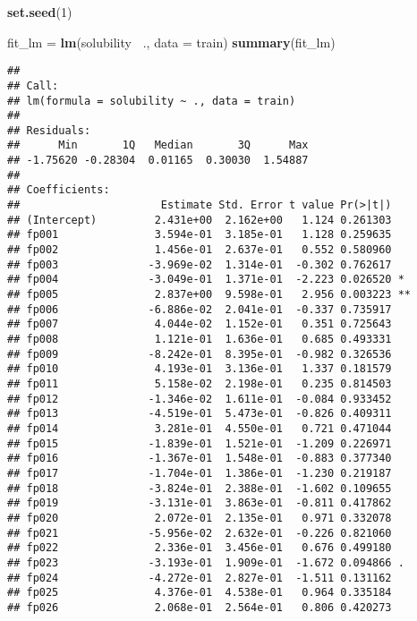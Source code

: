 \documentclass[
]{article}
\newenvironment{Shaded}{\begin{snugshade}}{\end{snugshade}}
\newcommand{\DataTypeTok}[1]{\textcolor[rgb]{0.13,0.29,0.53}{#1}}
\newcommand{\DecValTok}[1]{\textcolor[rgb]{0.00,0.00,0.81}{#1}}
\newcommand{\KeywordTok}[1]{\textcolor[rgb]{0.13,0.29,0.53}{\textbf{#1}}}
\newcommand{\NormalTok}[1]{#1}
\newcommand{\OperatorTok}[1]{\textcolor[rgb]{0.81,0.36,0.00}{\textbf{#1}}}
\newcommand{\StringTok}[1]{\textcolor[rgb]{0.31,0.60,0.02}{#1}}
\begin{document}
\begin{Shaded}
\begin{Highlighting}[]
\KeywordTok{set.seed}\NormalTok{(}\DecValTok{1}\NormalTok{)}

\NormalTok{fit_lm =}\StringTok{ }\KeywordTok{lm}\NormalTok{(solubility }\OperatorTok{~}\NormalTok{., }\DataTypeTok{data =}\NormalTok{ train)}
\KeywordTok{summary}\NormalTok{(fit_lm)}
\end{Highlighting}
\end{Shaded}

\begin{verbatim}
## 
## Call:
## lm(formula = solubility ~ ., data = train)
## 
## Residuals:
##      Min       1Q   Median       3Q      Max 
## -1.75620 -0.28304  0.01165  0.30030  1.54887 
## 
## Coefficients:
##                      Estimate Std. Error t value Pr(>|t|)    
## (Intercept)         2.431e+00  2.162e+00   1.124 0.261303    
## fp001               3.594e-01  3.185e-01   1.128 0.259635    
## fp002               1.456e-01  2.637e-01   0.552 0.580960    
## fp003              -3.969e-02  1.314e-01  -0.302 0.762617    
## fp004              -3.049e-01  1.371e-01  -2.223 0.026520 *  
## fp005               2.837e+00  9.598e-01   2.956 0.003223 ** 
## fp006              -6.886e-02  2.041e-01  -0.337 0.735917    
## fp007               4.044e-02  1.152e-01   0.351 0.725643    
## fp008               1.121e-01  1.636e-01   0.685 0.493331    
## fp009              -8.242e-01  8.395e-01  -0.982 0.326536    
## fp010               4.193e-01  3.136e-01   1.337 0.181579    
## fp011               5.158e-02  2.198e-01   0.235 0.814503    
## fp012              -1.346e-02  1.611e-01  -0.084 0.933452    
## fp013              -4.519e-01  5.473e-01  -0.826 0.409311    
## fp014               3.281e-01  4.550e-01   0.721 0.471044    
## fp015              -1.839e-01  1.521e-01  -1.209 0.226971    
## fp016              -1.367e-01  1.548e-01  -0.883 0.377340    
## fp017              -1.704e-01  1.386e-01  -1.230 0.219187    
## fp018              -3.824e-01  2.388e-01  -1.602 0.109655    
## fp019              -3.131e-01  3.863e-01  -0.811 0.417862    
## fp020               2.072e-01  2.135e-01   0.971 0.332078    
## fp021              -5.956e-02  2.632e-01  -0.226 0.821060    
## fp022               2.336e-01  3.456e-01   0.676 0.499180    
## fp023              -3.193e-01  1.909e-01  -1.672 0.094866 .  
## fp024              -4.272e-01  2.827e-01  -1.511 0.131162    
## fp025               4.376e-01  4.538e-01   0.964 0.335184    
## fp026               2.068e-01  2.564e-01   0.806 0.420273    

\end{verbatim}
\end{document}
